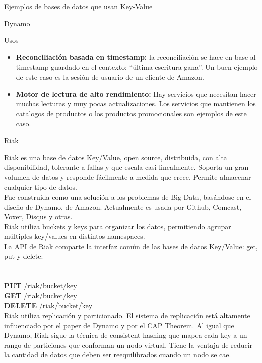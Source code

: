\begin{section}{Ejemplos de bases de datos que usan Key-Value}
\begin{subsection}{Dynamo}
\begin{subsubsection}{Usos}
\begin{itemize}
\item \textbf{Reconciliación basada en timestamp:} la reconciliación se hace en base al timestamp guardado en el contexto: “última escritura gana”. Un buen ejemplo de este caso es la sesión de usuario de un cliente de Amazon.\\

\item \textbf{Motor de lectura de alto rendimiento:} Hay servicios que necesitan hacer muchas lecturas y muy pocas actualizaciones. Los servicios que mantienen los catalogos de productos o los productos promocionales son ejemplos de este caso.\\

\end{itemize}

\end{subsubsection}

\end{subsection}

\begin{subsection}{Riak}

Riak es una base de datos Key/Value, open source, distribuida, con alta disponibilidad, tolerante a fallas y que escala casi linealmente. Soporta un gran volumen de datos y responde fácilmente a medida que crece. Permite almacenar cualquier tipo de datos.\\

Fue construida como una solución a los problemas de Big Data, basándose en el diseño de Dynamo, de Amazon. Actualmente es usada por Github, Comcast, Voxer, Disqus y otras.\\

Riak utiliza buckets y keys para organizar los datos, permitiendo agrupar múltiples key/values en distintos namespaces. \\

La API de Riak comparte la interfaz común de las bases de datos Key/Value: get, put y delete:\\
\\ \\
\textbf{PUT}    /riak/bucket/key \\
\textbf{GET}    /riak/bucket/key \\
\textbf{DELETE} /riak/bucket/key \\

Riak utiliza replicación y particionado. El sistema de replicación está altamente influenciado por el paper de Dynamo y por el CAP Theorem. Al igual que Dynamo, Riak sigue la técnica de consistent hashing que mapea cada key a un rango de particiones que conforman un nodo virtual. Tiene la ventaja de reducir la cantidad de datos que deben ser reequilibrados cuando un nodo se cae. \\


\end{subsection}
\end{section}

